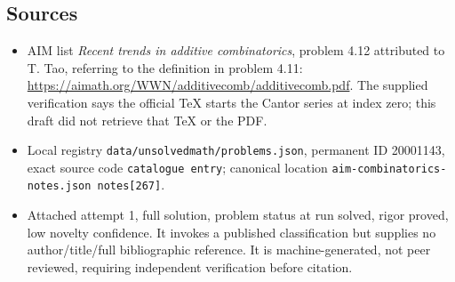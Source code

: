 \documentclass[11pt]{article}
\begin{document}
\subsection{Sources}
\begin{itemize}
\item AIM list \emph{Recent trends in additive combinatorics}, problem 4.12 attributed to T. Tao, referring to the definition in problem 4.11: \url{https://aimath.org/WWN/additivecomb/additivecomb.pdf}. The supplied verification says the official TeX starts the Cantor series at index zero; this draft did not retrieve that TeX or the PDF.
\item Local registry \texttt{data/unsolvedmath/problems.json}, permanent ID 20001143, exact source code \texttt{catalogue entry}; canonical location \texttt{aim-combinatorics-notes.json notes[267]}.
\item Attached attempt 1, full solution, problem status at run solved, rigor proved, low novelty confidence. It invokes a published classification but supplies no author/title/full bibliographic reference. It is machine-generated, not peer reviewed, requiring independent verification before citation.
\end{itemize}
\end{document}
